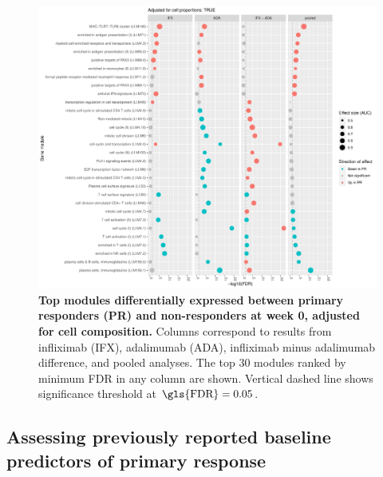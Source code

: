 \begin{figure}
    \centering
    \includegraphics[width=1.0\textwidth,page=1]{mainmatter/figures/chapter_04/plot_gene_set_enrichment.tmodCERNO_panelplot_reversed_C_1RI_1NI,C_1RA_1NA,C_(1RI_1NI)_(1RA_1NA),C_1R_1N.cell_prop_correction_TRUE.pdf}
    \caption[
    ]{
        \textbf{Top modules differentially expressed between primary responders (PR) and non-responders at week 0, adjusted for cell composition.}
        Columns correspond to results from infliximab (IFX), adalimumab (ADA), infliximab minus adalimumab difference, and pooled analyses. 
        The top 30 modules ranked by minimum \gls{FDR} in any column are shown. Vertical dashed line shows significance threshold at $\text{\gls{FDR}} = 0.05$.
    }
    \label{fig:multipants_dge_panelPlot_week_0_R_N_cellPropT}
\end{figure}

\subsection{Assessing previously reported baseline predictors of primary response}

